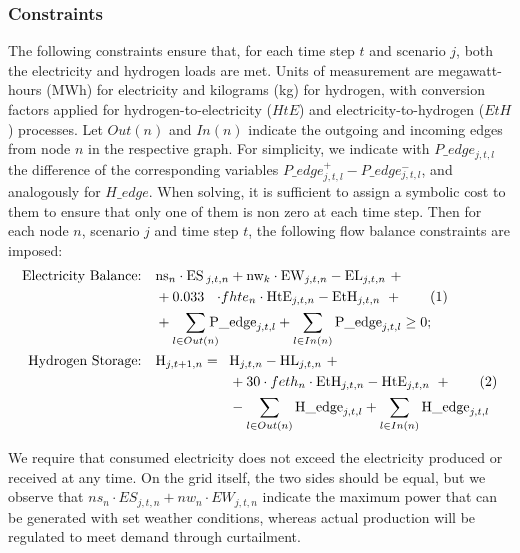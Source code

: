 \documentclass[smallextended,natbib]{svjour3}       %
\numberwithin{definition}{section}
\numberwithin{theorem}{section}
\numberwithin{proposition}{section}
\begin{document}
\subsubsection{Constraints}
The following constraints ensure that, for each time step $t$ and scenario $j$, both the electricity and hydrogen loads are met. Units of measurement are megawatt-hours (MWh) for electricity and kilograms (kg) for hydrogen, with conversion factors applied for hydrogen-to-electricity ($HtE$) and electricity-to-hydrogen ($EtH$) processes.
Let $Out(n)$ and $In(n)$ indicate the outgoing and incoming edges from node $n$ in the respective graph. 
For simplicity, we indicate with $P\_edge_{j,t,l}$ the difference of the corresponding variables $P\_edge^+_{j,t,l}-P\_edge^-_{j,t,l}$, and analogously for $H\_edge$. 
When solving, it is sufficient to assign a symbolic cost to them to ensure that only one of them is non zero at each time step. 
Then for each node $n$, scenario $j$ and time step $t$, the following flow balance constraints are imposed:
\begin{align*}
    \text{Electricity Balance:} \quad & \text{ns}_n \cdot \text{ES}\hspace{-1.2em}&_{j,t,n}&+ \text{nw}_k \cdot \text{EW}_{j,t,n} - \text{EL}_{j,t,n} \ + \\
    &  + 0.033\hspace{-2em}& \cdot f&hte_n \cdot \text{HtE}_{j,t,n} - \text{EtH}_{j,t,n}\ + \stepcounter{equation}\tag{\theequation}\label{constr_P}\\
    & + \sum_{l\in Out(n)}\hspace{-1.9em}&\text{P\_}&\text{edge}_{j,t,l} + \sum_{l\in In(n)} \text{P\_edge}_{j,t,l} \ge 0;\\
    \text{Hydrogen Storage:} \quad & \text{H}_{j,t+1,n} =\hspace{-5em}&& \text{H}_{j,t,n} - \text{HL}_{j,t,n}\ +\\ 
    &&& + 30 \cdot feth_n \cdot \text{EtH}_{j,t,n} - \text{HtE}_{j,t,n} \ + \stepcounter{equation}\tag{\theequation}\label{constr_H}\\
    &&& - \sum_{l\in Out(n)}\text{H\_edge}_{j,t,l} + \sum_{l\in In(n)}\text{H\_edge}_{j,t,l}
\end{align*}

We require that consumed electricity does not exceed the electricity produced or received at any time. 
On the grid itself, the two sides should be equal, but we observe that $ns_n\cdot ES_{j,t,n} + nw_n\cdot EW_{j,t,n}$ indicate the maximum power that can be generated with set weather conditions, whereas actual production will be regulated to meet demand through curtailment. 
\end{document}
